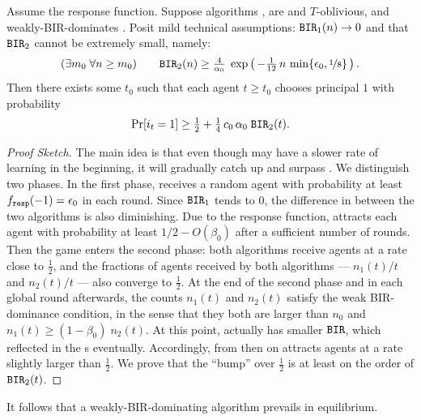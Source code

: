 \begin{theorem}\label{thm:SoftMax-strong}
Assume the \SoftMaxRandom response function. Suppose algorithms \alg[1], \alg[2] are \bmonotone and $T$-oblivious, and \alg[1] weakly-BIR-dominates \alg[2]. Posit mild technical assumptions:
  $\mathtt{BIR}_1(n) \to 0$ and that $\mathtt{BIR}_2$ cannot be extremely small, namely:
\begin{align}\label{eq:SoftMax-assn-strong}
(\exists m_0\; \forall n\geq m_0) \qquad
\mathtt{BIR}_2(n) \geq \tfrac{4}{\alpha_0}\;
\exp \left(\, - \tfrac{1}{12}\, n\,\min\{\epsilon_0, \nicefrac{1}{8}\} \,\right) .
\end{align}
Then there
  exists some $t_0$ such that each agent $t\geq t_0$ chooses principal
  $1$ with probability
\begin{align}\label{eq:thm:SoftMax-strong}
     \Pr[i_t = 1]\geq \tfrac12 +  \tfrac14 \,c_0\,\alpha_0\; \mathtt{BIR}_2(t).
\end{align}
\end{theorem}

\begin{proof}[Proof Sketch]
The main idea is that even though \alg[1] may have a
slower rate of learning in the beginning, it will gradually catch up
and surpass \alg[2]. We distinguish two phases. In
the first phase, \alg[1] receives a random agent with probability at
least $f_{\mathtt{resp}}(-1) = \epsilon_0$ in each round. Since $\mathtt{BIR}_1$ tends to 0,
the difference in  between the two algorithms is also
diminishing. Due to the \SoftMaxRandom response function, \alg[1]
attracts each agent with probability at least $1/2 - O(\beta_0)$ after
a sufficient number of rounds. Then the game enters the second phase:
both algorithms receive agents at a rate close to $\tfrac12$, and the
fractions of agents received by both algorithms --- $n_1(t)/t$ and
$n_2(t)/t$ --- also converge to $\tfrac12$. At the end of the second
phase and in each global round afterwards, the counts $n_1(t)$ and
$n_2(t)$ satisfy the weak BIR-dominance condition, in the sense that
they both are larger than $n_0$ and $n_1(t)\geq (1-\beta_0)\; n_2(t)$.
At this point, \alg[1] actually has smaller $\mathtt{BIR}$, which reflected in the {\PMR}s eventually. Accordingly, from then on \alg[1]
attracts agents at a rate slightly larger than $\tfrac12$. We prove
that the ``bump'' over $\tfrac12$ is at least on the order of
$\mathtt{BIR}_2(t)$.
\end{proof}

It follows that a weakly-BIR-dominating algorithm prevails in equilibrium.


